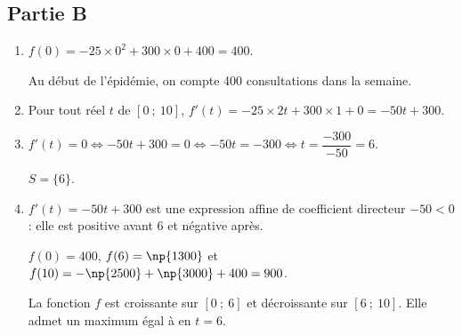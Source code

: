 \subsection*{Partie B}

\begin{enumerate}
	\item $f(0) = -25\times 0^2 + 300\times 0 + 400 = 400$.

	Au début de l'épidémie, on compte 400 consultations dans la semaine.

	\item Pour tout réel $t$ de $[0~;~10]$,
$f'(t) = -25\times 2t + 300\times 1 + 0 = -50t + 300$.

	\item $f'(t) = 0 \iff -50t + 300 = 0 \iff -50t = -300 \iff t = \dfrac{-300}{-50} = 6$.
	
$S = \{6\}$.

	\item $f'(t) = -50t + 300$ est une expression affine de coefficient directeur $-50 < 0$ : elle est
	positive avant 6 et négative après.

	$f(0) = 400$, $f(6) = \np{1300}$ et
	$f(10) = -\np{2500} + \np{3000} + 400 = 900$.

	\begin{center}
	\end{center}

	La fonction $f$ est croissante sur $[0~;~6]$ et décroissante sur $[6~;~10]$. Elle admet un
	maximum égal à  en $t = 6$.
\end{enumerate}
